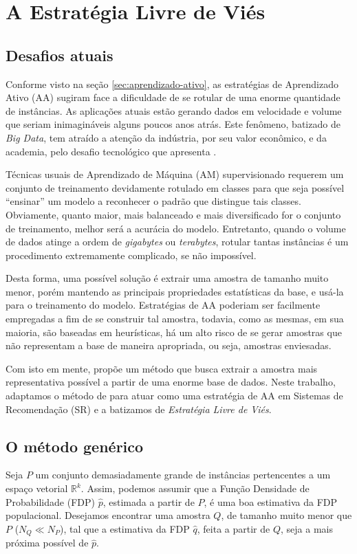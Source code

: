\chapter{A Estratégia Livre de Viés}
\label{cap:estrategia-livre-vies}

\section{Desafios atuais}
Conforme visto na seção \ref{sec:aprendizado-ativo}, as estratégias de Aprendizado Ativo (AA) sugiram face a dificuldade de se rotular de uma enorme quantidade de instâncias. As aplicações atuais estão gerando dados em velocidade e volume que seriam inimagináveis alguns poucos anos atrás. Este fenômeno, batizado de \textit{Big Data}, tem atraído a atenção da indústria, por seu valor econômico, e da academia, pelo desafio tecnológico que apresenta \citep{davenport_big_2014}.

Técnicas usuais de Aprendizado de Máquina (AM) supervisionado requerem um conjunto de treinamento devidamente rotulado em classes para que seja possível ``ensinar'' um modelo a reconhecer o padrão que distingue tais classes. Obviamente, quanto maior, mais balanceado e mais diversificado for o conjunto de treinamento, melhor será a acurácia do modelo. Entretanto, quando o volume de dados atinge a ordem de \textit{gigabytes} ou \textit{terabytes}, rotular tantas instâncias é um procedimento extremamente complicado, se não impossível.

Desta forma, uma possível solução é extrair uma amostra de tamanho muito menor, porém mantendo as principais propriedades estatísticas da base, e usá-la para o treinamento do modelo. Estratégias de AA poderiam ser facilmente empregadas a fim de se construir tal amostra, todavia, como as mesmas, em sua maioria, são baseadas em heurísticas, há um alto risco de se gerar amostras que não representam a base de maneira apropriada, ou seja, amostras enviesadas.

Com isto em mente, \citep{cadu:2013} propõe um método que busca extrair a amostra mais representativa possível a partir de uma enorme base de dados. Neste trabalho, adaptamos o método de \citep{cadu:2013} para atuar como uma estratégia de AA em Sistemas de Recomendação (SR) e a batizamos de \textit{Estratégia Livre de Viés}.

\section{O método genérico}
\label{sec:met-gen}
Seja $P$ um conjunto demasiadamente grande de instâncias pertencentes a um espaço vetorial $\mathbb{R}^k$. Assim, podemos assumir que a Função Densidade de Probabilidade (FDP) $\hat{p}$, estimada a partir de $P$, é uma boa estimativa da FDP populacional. Desejamos encontrar uma amostra $Q$, de tamanho muito menor que $P$ ($N_{Q} \ll N_{P}$), tal que a estimativa da FDP $\hat{q}$, feita a partir de $Q$, seja a mais próxima possível de $\hat{p}$.

